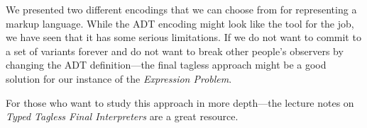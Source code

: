 We presented two different encodings that we can choose from for representing a
markup language. While the ADT encoding might look like the tool for the job, we
have seen that it has some serious limitations. If we do not want to commit to a
set of variants forever and do not want to break other people's observers by
changing the ADT definition—the final tagless approach might be a good solution
for our instance of the \emph{Expression Problem}.

For those who want to study this approach in more depth—the lecture notes on
\emph{Typed Tagless Final Interpreters} \cite{finally-tagless-tut} are a great
resource.
